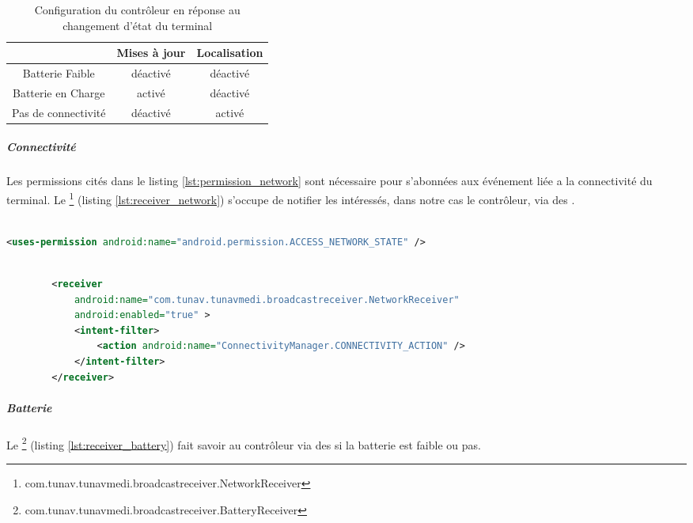 \begin{table}[H]
\centering
\begin{tabular}{|c|c|c|}
\hline
&\textsf{Mises à jour} & \textsf{Localisation}\\
\hline
\textsf{Batterie Faible} & déactivé & déactivé\\
\hline
\textsf{Batterie en Charge} & activé & déactivé\\
\hline
\textsf{Pas de connectivité} & déactivé & activé\\
\hline
\end{tabular}
\caption{Configuration du contrôleur en réponse au changement d’état du terminal}
\label{tab:status}
\end{table}

\subparagraph{Connectivité}

Les permissions cités dans le listing \ref{lst:permission_network} sont nécessaire pour s’abonnées aux événement liée a la connectivité du terminal. Le \footnote{com.tunav.tunavmedi.broadcastreceiver.NetworkReceiver} (listing \ref{lst:receiver_network}) s'occupe de notifier les intéressés, dans notre cas le contrôleur, via des .

\begin{lstlisting}[language=xml, label=lst:permission_network, caption=Déclaration dans AndroidManifest des permission d’accès à l’état des interfaces réseaux.]

<uses-permission android:name="android.permission.ACCESS_NETWORK_STATE" />

\end{lstlisting}

\begin{lstlisting}[language=xml, label=lst:receiver_network, caption=Déclaration dans AndroidManifest du  NetworkReceiver]

        <receiver
            android:name="com.tunav.tunavmedi.broadcastreceiver.NetworkReceiver"
            android:enabled="true" >
            <intent-filter>
                <action android:name="ConnectivityManager.CONNECTIVITY_ACTION" />
            </intent-filter>
        </receiver>

\end{lstlisting}

\subparagraph{Batterie}

Le \footnote{com.tunav.tunavmedi.broadcastreceiver.BatteryReceiver} (listing \ref{lst:receiver_battery}) fait savoir au contrôleur via des  si la batterie est faible ou pas.

